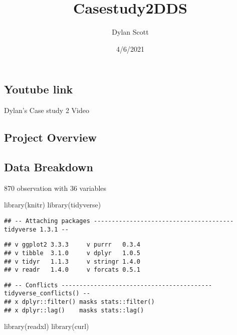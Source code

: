 \documentclass[
]{article}
\title{Casestudy2DDS}
\author{Dylan Scott}
\date{4/6/2021}
\newenvironment{Shaded}{\begin{snugshade}}{\end{snugshade}}
\newcommand{\FunctionTok}[1]{\textcolor[rgb]{0.00,0.00,0.00}{#1}}
\newcommand{\NormalTok}[1]{#1}
\begin{document}
\maketitle

\hypertarget{youtube-link}{%
\subsection{Youtube link}\label{youtube-link}}

Dylan's Case study 2 Video

\hypertarget{project-overview}{%
\subsection{Project Overview}\label{project-overview}}

\hypertarget{data-breakdown}{%
\subsection{Data Breakdown}\label{data-breakdown}}

870 observation with 36 variables

\begin{Shaded}
\begin{Highlighting}[]
\FunctionTok{library}\NormalTok{(knitr)}
\FunctionTok{library}\NormalTok{(tidyverse)}
\end{Highlighting}
\end{Shaded}

\begin{verbatim}
## -- Attaching packages --------------------------------------- tidyverse 1.3.1 --
\end{verbatim}

\begin{verbatim}
## v ggplot2 3.3.3     v purrr   0.3.4
## v tibble  3.1.0     v dplyr   1.0.5
## v tidyr   1.1.3     v stringr 1.4.0
## v readr   1.4.0     v forcats 0.5.1
\end{verbatim}

\begin{verbatim}
## -- Conflicts ------------------------------------------ tidyverse_conflicts() --
## x dplyr::filter() masks stats::filter()
## x dplyr::lag()    masks stats::lag()
\end{verbatim}

\begin{Shaded}
\begin{Highlighting}[]
\FunctionTok{library}\NormalTok{(readxl)}
\FunctionTok{library}\NormalTok{(curl)}
\end{Highlighting}
\end{Shaded}
\end{document}
